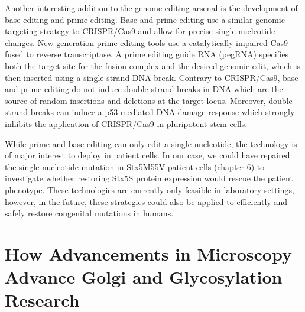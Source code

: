 Another interesting addition to the genome editing arsenal is the development of base editing and prime editing\cite{komor_programmable_2016,huang_precision_2021,anzalone_search-and-replace_2019}. Base and prime editing use a similar genomic targeting strategy to CRISPR/Cas9 and allow for precise single nucleotide changes. New generation prime editing tools use a catalytically impaired Cas9 fused to reverse transcriptase\cite{anzalone_search-and-replace_2019}. A prime editing guide RNA (pegRNA) specifies both the target site for the fusion complex and the desired genomic edit, which is then inserted using a single strand DNA break. Contrary to CRISPR/Cas9, base and prime editing do not induce double-strand breaks in DNA which are the source of random insertions and deletions at the target locus\cite{cox_therapeutic_2015,hilton_enabling_2015}. Moreover, double-strand breaks can induce a p53-mediated DNA damage response which strongly inhibits the application of CRISPR/Cas9 in pluripotent stem cells\cite{ihry_p53_2018,haapaniemi_crisprcas9_2018}.

While prime and base editing can only edit a single nucleotide, the technology is of major interest to deploy in patient cells. In our case, we could have repaired the single nucleotide mutation in Stx5M55V patient cells (chapter 6) to investigate whether restoring Stx5S protein expression would rescue the patient phenotype. These technologies are currently only feasible in laboratory settings, however, in the future, these strategies could also be applied to efficiently and safely restore congenital mutations in humans.

\section{How Advancements in Microscopy Advance Golgi and Glycosylation Research}

